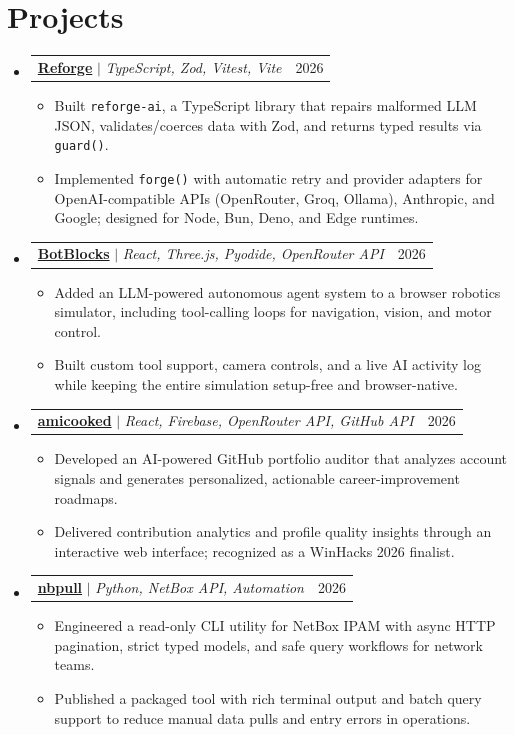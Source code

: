 \documentclass[letterpaper,11pt]{article}
\makeatletter
\newcommand{\resumeItem}[1]{
  \item\small{
    {#1 \vspace{-2pt}}
  }
}
\newcommand{\resumeProjectHeading}[2]{
    \item
    \begin{tabular*}{0.97\textwidth}{l@{\extracolsep{\fill}}r}
      \small#1 & #2 \\
    \end{tabular*}\vspace{-7pt}
}
\newcommand{\resumeSubHeadingListStart}{\begin{itemize}[leftmargin=0.15in, label={}]}
\newcommand{\resumeSubHeadingListEnd}{\end{itemize}\vspace{-8pt}}
\newcommand{\resumeItemListStart}{\begin{itemize}\vspace{-2pt}}
\newcommand{\resumeItemListEnd}{\end{itemize}\vspace{-8pt}}
\makeatother
\begin{document}
\section{Projects}
    \resumeSubHeadingListStart
    \resumeProjectHeading{\href{https://github.com/Champion2005/reforge}{{\textbf{Reforge}}} $|$ \emph{TypeScript, Zod, Vitest, Vite}}{2026}
      \resumeItemListStart
      \resumeItem{Built \texttt{reforge-ai}, a TypeScript library that repairs malformed LLM JSON, validates/coerces data with Zod, and returns typed results via \texttt{guard()}.}
      \resumeItem{Implemented \texttt{forge()} with automatic retry and provider adapters for OpenAI-compatible APIs (OpenRouter, Groq, Ollama), Anthropic, and Google; designed for Node, Bun, Deno, and Edge runtimes.}
      \resumeItemListEnd

    \resumeProjectHeading{\href{https://github.com/Champion2005/botblocks}{{\textbf{BotBlocks}}} $|$ \emph{React, Three.js, Pyodide, OpenRouter API}}{2026}
      \resumeItemListStart
      \resumeItem{Added an LLM-powered autonomous agent system to a browser robotics simulator, including tool-calling loops for navigation, vision, and motor control.}
      \resumeItem{Built custom tool support, camera controls, and a live AI activity log while keeping the entire simulation setup-free and browser-native.}
      \resumeItemListEnd

    \resumeProjectHeading{\href{https://github.com/Champion2005/amicooked}{{\textbf{amicooked}}} $|$ \emph{React, Firebase, OpenRouter API, GitHub API}}{2026}
            \resumeItemListStart
      \resumeItem{Developed an AI-powered GitHub portfolio auditor that analyzes account signals and generates personalized, actionable career-improvement roadmaps.}
      \resumeItem{Delivered contribution analytics and profile quality insights through an interactive web interface; recognized as a WinHacks 2026 finalist.}
            \resumeItemListEnd

        \resumeProjectHeading{\href{https://github.com/Champion2005/nbpull}{{\textbf{nbpull}}} $|$ \emph{Python, NetBox API, Automation}}{2026}
            \resumeItemListStart
      \resumeItem{Engineered a read-only CLI utility for NetBox IPAM with async HTTP pagination, strict typed models, and safe query workflows for network teams.}
      \resumeItem{Published a packaged tool with rich terminal output and batch query support to reduce manual data pulls and entry errors in operations.}
            \resumeItemListEnd
    \resumeSubHeadingListEnd
\end{document}
